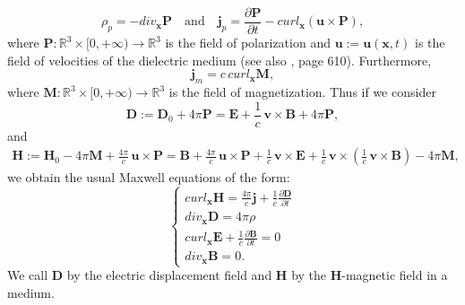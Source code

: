 \documentclass{article}
\theoremstyle{definition}
\theoremstyle{remark}
\renewcommand{\vec}[1]{\mathbf{#1}}
\newcommand{\R}{\mathbb{R}}
\newcommand{\R}{{\mathbb{R}}}
\begin{document}
\begin{equation}\label{PolarGGint}
\rho_p=-div_{\vec x} \vec P\quad\text{and}\quad
\vec j_p=\frac{\partial \vec P}{\partial t}-curl_{\vec x}\left(
\vec u\times \vec P\right),
\end{equation}
where $\vec P:\R^3\times[0,+\infty)\to\R^3$ is the field of
polarization and $\vec u:=\vec u(\vec x,t)$ is the field of
velocities of the dielectric medium (see also \cite{PC}, page 610).
Furthermore,
\begin{equation}\label{MagnetGGint}
\vec j_m=c\, curl_{\vec x} \vec M,
\end{equation}
where $\vec M:\R^3\times[0,+\infty)\to\R^3$ is the field of
magnetization. Thus if we consider
\begin{equation}\label{OprdddGGint}
\vec D:=\vec D_0+4\pi \vec P=\vec E+\frac{1}{c}\,\vec v\times \vec
B+4\pi \vec P,
\end{equation}
and
\begin{multline}\label{Oprddd1GGint}
\vec H:=\vec H_0-4\pi \vec M+\frac{4\pi}{c}\,\vec u\times \vec P
=\vec B+\frac{4\pi}{c}\,\vec u\times \vec P+\frac{1}{c}\,\vec
v\times \vec E+\frac{1}{c}\,\vec v\times\left(\frac{1}{c}\,\vec
v\times \vec B\right)-4\pi \vec M,
\end{multline}
we obtain the usual Maxwell equations of the form:
\begin{equation}\label{MaxMedFullGGint}
\begin{cases}
curl_{\vec x} \vec H= \frac{4\pi}{c}\vec j+
\frac{1}{c}\frac{\partial \vec D}{\partial t}
\\
div_{\vec x} \vec D= 4\pi\rho
\\
curl_{\vec x} \vec E+\frac{1}{c}\frac{\partial \vec B}{\partial t}=
0
\\
div_{\vec x} \vec B=0.
%
\end{cases}
\end{equation}
We call $\vec D$ by the electric displacement field and $\vec H$ by
the $\vec H$-magnetic field in a medium.
\end{document}
